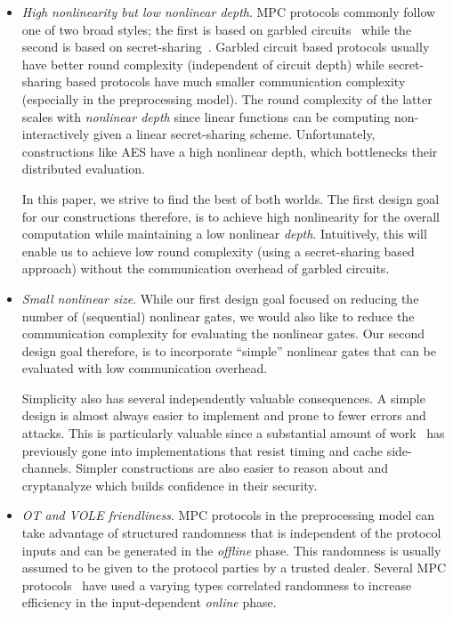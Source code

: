 \begin{itemize}[itemsep=1ex]
    \item \textit{High nonlinearity but low nonlinear depth}.
    MPC protocols commonly follow one of two broad styles; the first is based on garbled circuits~\cite{?} while the second is based on secret-sharing~\cite{?}. Garbled circuit based protocols usually have better round complexity (independent of circuit depth) while secret-sharing based protocols have much smaller communication complexity (especially in the preprocessing model). The round complexity of the latter scales with \textit{nonlinear depth} since linear functions can be computing non-interactively given a linear secret-sharing scheme. Unfortunately, constructions like AES have a high nonlinear depth, which bottlenecks their distributed evaluation.

    \hspace*{1em} In this paper, we strive to find the best of both worlds. The first design goal for our constructions therefore, is to achieve high nonlinearity for the overall computation while maintaining a low nonlinear \textit{depth}. Intuitively, this will enable us to achieve low round complexity (using a secret-sharing based approach) without the communication overhead of garbled circuits.

    \item \textit{Small nonlinear size}.
    While our first design goal focused on reducing the number of (sequential) nonlinear gates, we would also like to reduce the communication complexity for evaluating the nonlinear gates. Our second design goal therefore, is to incorporate ``simple'' nonlinear gates that can be evaluated with low communication overhead. 

    \hspace*{1em} Simplicity also has several independently valuable consequences. A simple design is almost always easier to implement and prone to fewer errors and attacks. This is particularly valuable since a substantial amount of work~\cite{?} has previously gone into implementations that resist timing and cache side-channels. Simpler constructions are also easier to reason about and cryptanalyze which builds confidence in their security.

    \item \textit{\textnormal{OT} and \textnormal{VOLE} friendliness}.
    MPC protocols in the preprocessing model can take advantage of structured randomness that is independent of the protocol inputs and can be generated in the \textit{offline} phase. This randomness is usually assumed to be given to the protocol parties by a trusted dealer. Several MPC protocols~\cite{?} have used a varying types correlated randomness to increase efficiency in the input-dependent \textit{online} phase.


\end{itemize}
